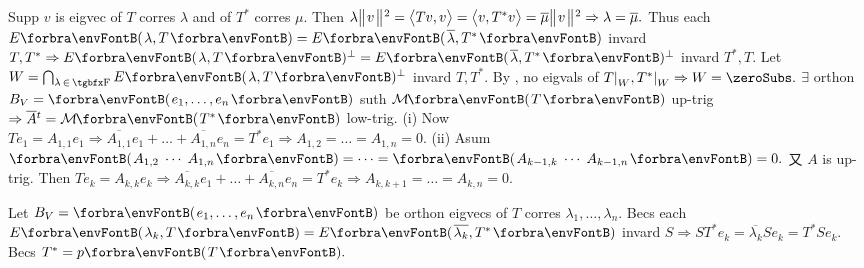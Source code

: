 Supp $v$ is eigvec of $T$ corres $\lambda$ and of $T^*$ corres $\mu.$\parSol{}
Then $\lambda\big\Vert\hspace{1pt}{}v{}\hspace{1pt}\big\Vert{\hspace{0.5pt}}{^2}=\big\langle{}Tv,v{}\big\rangle=\big\langle{}v,T^*v{}\big\rangle=\overline{\mu}\big\Vert\hspace{1pt}{}v{}\hspace{1pt}\big\Vert{\hspace{0.5pt}}{^2}\Rightarrow\lambda=\overline{\mu}.$\parSol{}
Thus each $E\Par{\lambda,T}=E\Par{\overline{\lambda},T^*}$ invard $T,T^*\Rightarrow E\Par{\lambda,T}{^\perp}=E\Par{\overline{\lambda},T^*}{^\perp}$ invard $T^*,T.$\parSol{}
Let $W=\bigcap_{\lambda\,\in\,\Fbb}E\Par{\lambda,T}{^\perp}$ invard $T,T^*.$ By , no eigvals of $T\mmid_W,T^*\mmid_W\Rightarrow W=\zeroSubs.$\PfEnd\vspace{4pt}\parSol{}
\Or $\exists$ orthon $B_V=\Par{e_1,\dots,e_n}$ suth $\Mt{T}$ up-trig $\Rightarrow\overline{A}{^t}=\Mt{T^*}$ low-trig.\parSol{}
(i) Now $Te_1=A_{1,1}e_1\Rightarrow\overline{A_{1,1}}e_1+\dots+\overline{A_{1,n}}e_n=T^*e_1\Rightarrow A_{1,2}=\dots=A_{1,n}=0.$\parSol{}
(ii) Asum $\Par{A_{1,2}\;\cdots\;A_{1,n}}=\dots=\Par{A_{k-1,k}\;\cdots\;A_{k-1,n}}=0.$ 又 $A$ is up-trig.\vspace{1pt}\parSol{\Hii}
Then $Te_{k}=A_{k,k}e_{k}\Rightarrow\overline{A_{k,k}}e_1+\dots+\overline{A_{k,n}}e_n=T^*e_{k}\Rightarrow A_{k,k+1}=\dots=A_{k,n}=0.$\PfEnd
\SepLine


Let $B_V=\Par{e_1,\dots,e_n}$ be orthon eigvecs of $T$ corres $\lambda_1,\dots,\lambda_n.$\parSol{}
Becs each $E\Par{\lambda_k,T}=E\Par{\overline{\lambda_k},T^*}$ invard $S\Rightarrow ST^*e_k=\overline{\lambda_k}Se_k=T^*Se_k.$ \;\Or Becs $T^*=p\Par{T}.$\PfEnd
\SepLine

